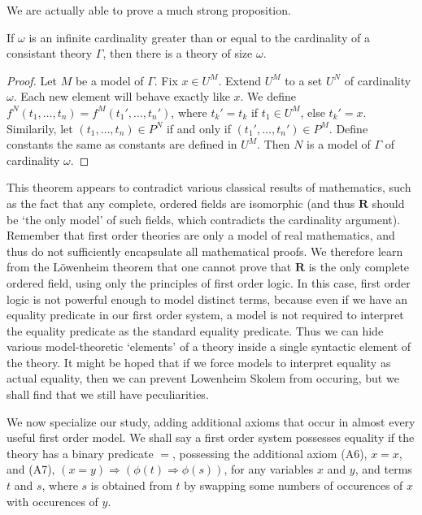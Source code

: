 We are actually able to prove a much strong proposition.

\begin{corollary}
    If $\omega$ is an infinite cardinality greater than or equal to the cardinality of a consistant theory $\Gamma$, then there is a theory of size $\omega$.
\end{corollary}
\begin{proof}
    Let $M$ be a model of $\Gamma$. Fix $x \in U^M$. Extend $U^M$ to a set $U^N$ of cardinality $\omega$. Each new element will behave exactly like $x$. We define $f^N(t_1, \dots, t_n) = f^M(t_1', \dots, t_n')$, where $t_k' = t_k$ if $t_1 \in U^M$, else $t_k' = x$. Similarily, let $(t_1, \dots, t_n) \in P^N$ if and only if $(t_1', \dots, t_n') \in P^M$. Define constants the same as constants are defined in $U^M$. Then $N$ is a model of $\Gamma$ of cardinality $\omega$.
\end{proof}

This theorem appears to contradict various classical results of mathematics, such as the fact that any complete, ordered fields are isomorphic (and thus $\mathbf{R}$ should be `the only model' of such fields, which contradicts the cardinality argument). Remember that first order theories are only a model of real mathematics, and thus do not sufficiently encapsulate all mathematical proofs. We therefore learn from the L\"{o}wenheim theorem that one cannot prove that $\mathbf{R}$ is the only complete ordered field, using only the principles of first order logic. In this case, first order logic is not powerful enough to model distinct terms, because even if we have an equality predicate in our first order system, a model is not required to interpret the equality predicate as the standard equality predicate. Thus we can hide various model-theoretic `elements' of a theory inside a single syntactic element of the theory. It might be hoped that if we force models to interpret equality as actual equality, then we can prevent Lowenheim Skolem from occuring, but we shall find that we still have peculiarities.

We now specialize our study, adding additional axioms that occur in almost every useful first order model. We shall say a first order system possesses equality if the theory has a binary predicate $=$, possessing the additional axiom (A6), $x = x$, and (A7), $(x = y) \Rightarrow (\phi(t) \Rightarrow \phi(s))$, for any variables $x$ and $y$, and terms $t$ and $s$, where $s$ is obtained from $t$ by swapping some numbers of occurences of $x$ with occurences of $y$.

